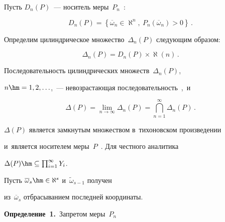   


  


  Пусть $D_n(P)$~--- носитель меры~$P_n$~\cite{3-mar}:


  $$


  D_n(P)=\left\{ \overline{\omega}_n\in \aleph^n,\ 


P_n\left(\overline{\omega}_n\right)>0\right\}\,.


  $$


  


  Определим цилиндрическое множество~$\Delta_n(P)$ следующим образом: 


  $$


  \Delta_n(P) =D_n(P)\times \aleph(n)\,.


  $$


  


  Последовательность цилиндрических множеств~$\Delta_n(P)$, 


$n\hm=1, 2,\ldots$,~---  невозрастающая последовательность~\cite{3-mar},~и 


  \begin{equation*}


  \Delta(P)=\lim\limits_{n\to\infty} \Delta_n(P)=\bigcap\limits_{n=1}^\infty 


\Delta_n (P)\,.




  \end{equation*}


  $\Delta(P)$ является замкнутым множеством в~тихоновском произведении 


и~является носителем меры~$P$~\cite{3-mar}. Для честного аналитика 


$\Delta(P)\hm\subseteq \prod_{i=1}^\infty Y_i$. 


  


  Пусть $\overline{\omega}_s\hm\in \aleph^s$ и~$\tilde{\omega}_{s-1}$ получен 


из~$\overline{\omega}_s$ отбрасыванием последней координаты. 


  


  \smallskip


  


  \noindent


  \textbf{Определение~1.}\ Запретом меры~$P_n$~\cite{4-mar, 5-mar} 


